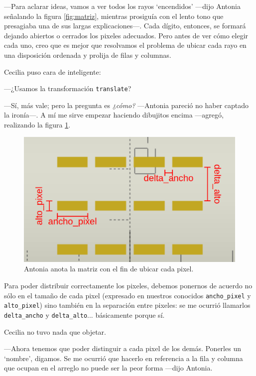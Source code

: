 ---Para aclarar ideas, vamos a ver todos los rayos `encendidos'
---dijo Antonia señalando la figura \ref{fig:matriz}, mientras
prosiguía con el lento tono que presagiaba una de sus largas
explicaciones---. Cada dígito, entonces, se formará dejando abiertos o
cerrados los pixeles adecuados. Pero antes de ver cómo elegir cada
uno, creo que es mejor que resolvamos el problema de ubicar cada rayo
en una disposición ordenada y prolija de filas y columnas.

Cecilia puso cara de inteligente:

---¿Usamos la transformación \lstinline!translate!?

---Sí, más vale; pero la pregunta es \emph{¿cómo?} ---Antonia pareció
no haber captado la ironía---. A mí me sirve empezar haciendo
dibujitos encima ---agregó, realizando la figura
\ref{fig:matriz-anotada-2}.

\begin{figure}[ht]
  \centering
  \includegraphics[width=.55\textwidth]{imagenes/matriz-anotada-2}
  \caption{Antonia anota la matriz con el fin de ubicar cada pixel.}
  \label{fig:matriz-anotada-2}
\end{figure}
  


\guillemotright Para poder distribuir correctamente los pixeles,
debemos ponernos de acuerdo no sólo en el tamaño de cada pixel
(expresado en nuestros conocidos \texttt{ancho\_pixel} y
\texttt{alto\_pixel}) sino también en la separación entre pixeles: se
me ocurrió llamarlos \texttt{delta\_ancho} y
\texttt{delta\_alto}... básicamente porque sí.

Cecilia no tuvo nada que objetar.

---Ahora tenemos que poder distinguir a cada pixel de los
demás. Ponerles un `nombre', digamos. Se me ocurrió que hacerlo en
referencia a la fila y columna que ocupan en el arreglo no puede ser
la peor forma ---dijo Antonia.


